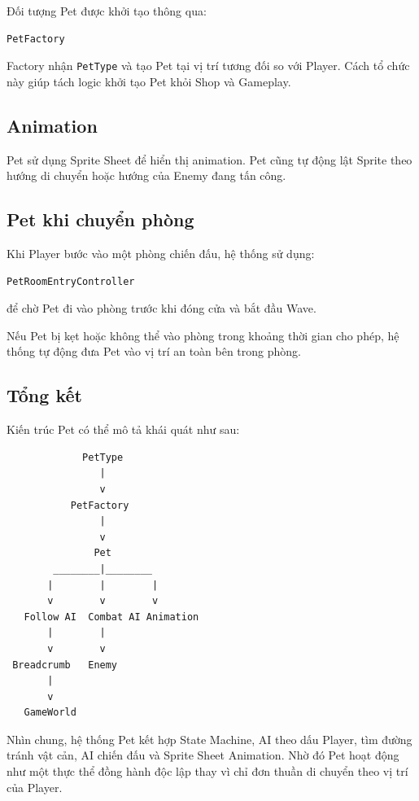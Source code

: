 \documentclass[12pt,a4paper]{report}
\begin{document}
    Đối tượng Pet được khởi tạo thông qua:

    \begin{verbatim}
PetFactory
    \end{verbatim}

    Factory nhận \texttt{PetType} và tạo Pet tại vị trí tương đối
    so với Player. Cách tổ chức này giúp tách logic khởi tạo Pet
    khỏi Shop và Gameplay.

    \subsection{Animation}

    Pet sử dụng Sprite Sheet để hiển thị animation.
    Pet cũng tự động lật Sprite theo hướng di chuyển hoặc hướng
    của Enemy đang tấn công.

    \subsection{Pet khi chuyển phòng}

    Khi Player bước vào một phòng chiến đấu, hệ thống sử dụng:

    \begin{verbatim}
PetRoomEntryController
    \end{verbatim}

    để chờ Pet đi vào phòng trước khi đóng cửa và bắt đầu Wave.

    Nếu Pet bị kẹt hoặc không thể vào phòng trong khoảng thời gian
    cho phép, hệ thống tự động đưa Pet vào vị trí an toàn bên trong
    phòng.

    \subsection{Tổng kết}

    Kiến trúc Pet có thể mô tả khái quát như sau:

    \begin{verbatim}
             PetType
                |
                v
           PetFactory
                |
                v
               Pet
        ________|________
       |        |        |
       v        v        v
   Follow AI  Combat AI Animation
       |        |
       v        v
 Breadcrumb   Enemy
       |
       v
   GameWorld
    \end{verbatim}

    Nhìn chung, hệ thống Pet kết hợp State Machine, AI theo dấu Player,
    tìm đường tránh vật cản, AI chiến đấu và Sprite Sheet Animation.
    Nhờ đó Pet hoạt động như một thực thể đồng hành độc lập thay vì
    chỉ đơn thuần di chuyển theo vị trí của Player.
\end{document}
